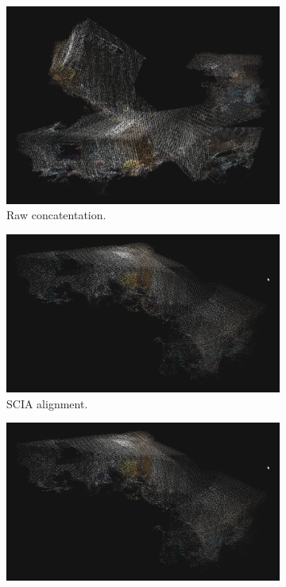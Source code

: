 \documentclass[letterpaper, oneside, 10pt]{report}
\begin{document}
\begin{figure}[h]
    \centering
    \begin{subfigure}[h]{0.31\textwidth}
        \centering
        \includegraphics[width=\textwidth]{images/fusion_raw}
        \caption{Raw concatentation.}
        \label{fig:Raw concatentation.}
    \end{subfigure}
    \hfill
    \begin{subfigure}[h]{0.31\textwidth}
        \centering
        \includegraphics[width=\textwidth]{images/fusion_scia}
        \caption{SCIA alignment.}
        \label{fig:SCIA alignment.}
    \end{subfigure}
    \hfill
    \begin{subfigure}[h]{0.31\textwidth}
        \centering
        \includegraphics[width=\textwidth]{images/fusion_scia}

\end{subfigure}
\end{figure}
\end{document}
